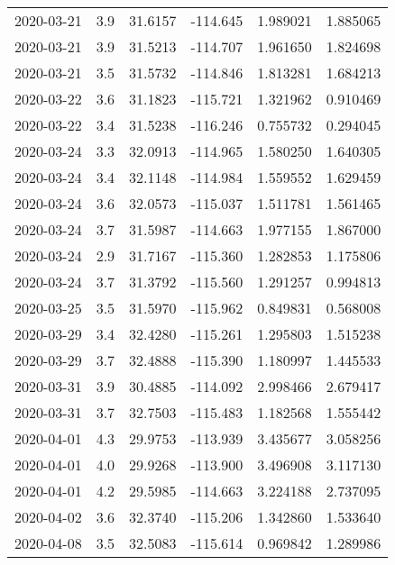 \begin{tabular}{lrrrrr}
2020-03-21 &       3.9 &  31.6157 &  -114.645 &         1.989021 &         1.885065 \\
2020-03-21 &       3.9 &  31.5213 &  -114.707 &         1.961650 &         1.824698 \\
2020-03-21 &       3.5 &  31.5732 &  -114.846 &         1.813281 &         1.684213 \\
2020-03-22 &       3.6 &  31.1823 &  -115.721 &         1.321962 &         0.910469 \\
2020-03-22 &       3.4 &  31.5238 &  -116.246 &         0.755732 &         0.294045 \\
2020-03-24 &       3.3 &  32.0913 &  -114.965 &         1.580250 &         1.640305 \\
2020-03-24 &       3.4 &  32.1148 &  -114.984 &         1.559552 &         1.629459 \\
2020-03-24 &       3.6 &  32.0573 &  -115.037 &         1.511781 &         1.561465 \\
2020-03-24 &       3.7 &  31.5987 &  -114.663 &         1.977155 &         1.867000 \\
2020-03-24 &       2.9 &  31.7167 &  -115.360 &         1.282853 &         1.175806 \\
2020-03-24 &       3.7 &  31.3792 &  -115.560 &         1.291257 &         0.994813 \\
2020-03-25 &       3.5 &  31.5970 &  -115.962 &         0.849831 &         0.568008 \\
2020-03-29 &       3.4 &  32.4280 &  -115.261 &         1.295803 &         1.515238 \\
2020-03-29 &       3.7 &  32.4888 &  -115.390 &         1.180997 &         1.445533 \\
2020-03-31 &       3.9 &  30.4885 &  -114.092 &         2.998466 &         2.679417 \\
2020-03-31 &       3.7 &  32.7503 &  -115.483 &         1.182568 &         1.555442 \\
2020-04-01 &       4.3 &  29.9753 &  -113.939 &         3.435677 &         3.058256 \\
2020-04-01 &       4.0 &  29.9268 &  -113.900 &         3.496908 &         3.117130 \\
2020-04-01 &       4.2 &  29.5985 &  -114.663 &         3.224188 &         2.737095 \\
2020-04-02 &       3.6 &  32.3740 &  -115.206 &         1.342860 &         1.533640 \\
2020-04-08 &       3.5 &  32.5083 &  -115.614 &         0.969842 &         1.289986 \\

\end{tabular}
